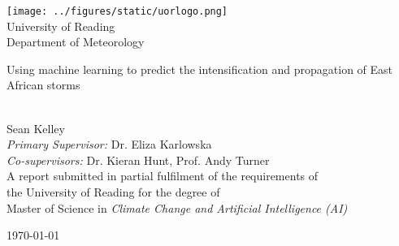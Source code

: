\documentclass[a4paper,11pt,oneside]{book}
\begin{document}
    
    \frontmatter
    
    \begin{titlepage}      
        \begin{center}
            \texttt{[image: ../figures/static/uorlogo.png]}\\[0.5cm]
            {\LARGE University of Reading\\[0.5cm]
            Department of Meteorology}\\[2cm]
			
            \linespread{1.2}\huge {
                Using machine learning to predict the intensification and propagation of East African storms
            
            }
            \linespread{1}~\\[2cm]
            {\Large
                Sean Kelley
            }\\[1cm] 
            
            {\large           
                \emph{Primary Supervisor:} Dr. Eliza Karlowska\\
                \emph{Co-supervisors:} Dr. Kieran Hunt, Prof. Andy Turner 
            }\\[1cm]
            
            \large A report submitted in partial fulfilment of the requirements of\\the University of Reading for the degree of\\
            Master of Science in \textit{Climate Change and Artificial Intelligence (AI)}\\[0.3cm] 
            \vfill
            
            \today %
        \end{center}
    \end{titlepage}
    
    
    
    

    

    \tableofcontents
    \listoffigures
    \listoftables

    
    \printnomenclature
    \newpage

    
    \printglossary
    \printglossary[type=\acronymtype]
    \newpage

    \mainmatter
    
    
    
    
    
    
    
    

    
    
    \begin{appendices}
        
    \end{appendices}
    
\end{document}
